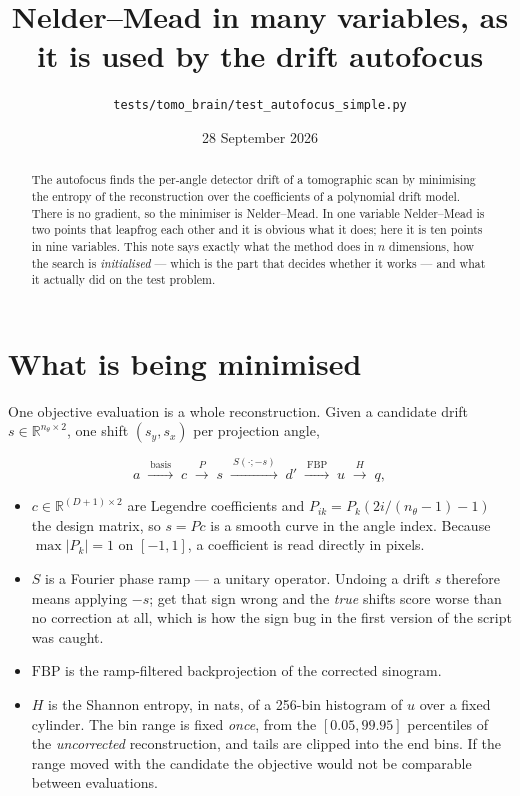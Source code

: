 \documentclass[11pt,a4paper]{article}
\title{Nelder--Mead in many variables, as it is used by the drift autofocus}
\author{\texttt{tests/tomo\_brain/test\_autofocus\_simple.py}}
\date{28 September 2026}
\begin{document}
\maketitle

\begin{abstract}
The autofocus finds the per-angle detector drift of a tomographic scan by
minimising the entropy of the reconstruction over the coefficients of a
polynomial drift model.  There is no gradient, so the minimiser is
Nelder--Mead.  In one variable Nelder--Mead is two points that leapfrog each
other and it is obvious what it does; here it is ten points in nine variables.
This note says exactly what the method does in $n$ dimensions, how the search
is \emph{initialised} --- which is the part that decides whether it works ---
and what it actually did on the test problem.
\end{abstract}

\section{What is being minimised}

One objective evaluation is a whole reconstruction.  Given a candidate drift
$s\in\mathbb{R}^{n_\theta\times2}$, one shift $(s_y,s_x)$ per projection angle,

\begin{equation}
  a \;\xrightarrow{\ \text{basis}\ }\; c
  \;\xrightarrow{\ P\ }\; s
  \;\xrightarrow{\ S(\cdot;-s)\ }\; d'
  \;\xrightarrow{\ \mathrm{FBP}\ }\; u
  \;\xrightarrow{\ H\ }\; q ,
  \label{eq:chain}
\end{equation}

\begin{itemize}
\item $c\in\mathbb{R}^{(D+1)\times2}$ are Legendre coefficients and
  $P_{ik}=P_k(2i/(n_\theta-1)-1)$ the design matrix, so $s=Pc$ is a smooth
  curve in the angle index.  Because $\max|P_k|=1$ on $[-1,1]$, a coefficient
  is read directly in pixels.
\item $S$ is a Fourier phase ramp --- a unitary operator.  Undoing a drift $s$
  therefore means applying $-s$; get that sign wrong and the \emph{true}
  shifts score worse than no correction at all, which is how the sign bug in
  the first version of the script was caught.
\item $\mathrm{FBP}$ is the ramp-filtered backprojection of the corrected
  sinogram.
\item $H$ is the Shannon entropy, in nats, of a 256-bin histogram of $u$ over
  a fixed cylinder.  The bin range is fixed \emph{once}, from the
  $[0.05,99.95]$ percentiles of the \emph{uncorrected} reconstruction, and
  tails are clipped into the end bins.  If the range moved with the candidate
  the objective would not be comparable between evaluations.
\end{itemize}
\end{document}
